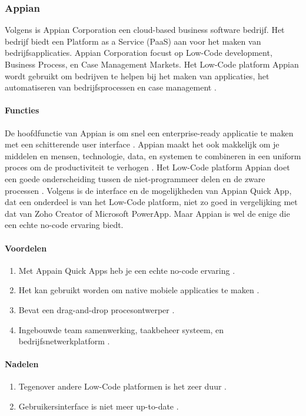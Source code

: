 \subsubsection*{Appian}
Volgens \textcite{Shala} is Appian Corporation een cloud-based business software bedrijf. Het bedrijf biedt een Platform as a Service (PaaS) aan voor het maken van bedrijfsapplicaties.
Appian Corporation focust op Low-Code development, Business Process, en Case Management Markets. Het Low-Code platform Appian wordt gebruikt om bedrijven te helpen
bij het maken van applicaties, het automatiseren van bedrijfsprocessen en case management \autocite{Shala}.
\paragraph{Functies}
De hoofdfunctie van Appian is om snel een enterprise-ready applicatie te maken met een schitterende user interface \autocite{Shala}. Appian maakt het ook makkelijk 
om je middelen en mensen, technologie, data, en systemen te combineren in een uniform proces om de productiviteit te verhogen \autocite{Shala}.
Het Low-Code platform Appian doet een goede onderscheiding tussen de niet-programmeer delen en de zware processen \autocite{Marvin2017}.
Volgens \textcite{Marvin2017} is de interface en de mogelijkheden van Appian Quick App, dat een onderdeel is van het Low-Code platform, niet zo goed in vergelijking met dat van Zoho Creator of Microsoft PowerApp. Maar Appian is wel de enige die een echte no-code ervaring biedt.

\paragraph*{Voordelen}
\begin{enumerate}
    \item Met Appain Quick Apps heb je een echte no-code ervaring \autocite{Marvin2017}.
    \item Het kan gebruikt worden om native mobiele applicaties te maken \autocite{Marvin2017}.
    \item Bevat een drag-and-drop procesontwerper \autocite{Marvin2017}.
    \item Ingebouwde team samenwerking, taakbeheer systeem, en bedrijfsnetwerkplatform \autocite{Marvin2017}.
\end{enumerate}


\paragraph*{Nadelen}
\begin{enumerate}
    \item Tegenover andere Low-Code platformen is het zeer duur \autocite{Marvin2017}.
    \item Gebruikersinterface is niet meer up-to-date \autocite{Marvin2017}.
\end{enumerate}

